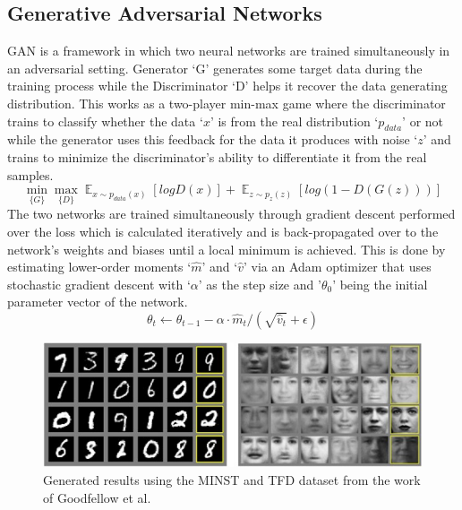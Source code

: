 \documentclass{Configuration_Files/PoliMi3i_thesis}
\begin{document}
\subsection{Generative Adversarial Networks}
GAN is a framework in which two neural networks are trained simultaneously in an 
adversarial setting. Generator ‘G’ generates some target data during the training 
process while the Discriminator ‘D’ helps it recover the data generating distribution. 
This works as a two-player min-max game \cite{IaG14} where the discriminator trains to 
classify whether the data ‘$x$’ is from the real distribution ‘$p_{data}$’ or not while the 
generator uses this feedback for the data it produces with noise ‘$z$’ and trains to 
minimize the discriminator’s ability to differentiate it from the real samples.
\begin{equation} \label{eq:ganminmax}
\min_{\{G\}}\max_{\{D\}} \mathop{{}\mathbb{E}}_{x\sim p_{data}(x)}[logD(x)]+ \mathop{{}\mathbb{E}}_{z\sim p_{z}(z)}[log(1-D(G(z)))]
\end{equation}
The two networks are trained simultaneously through gradient descent performed
over the loss which is calculated iteratively and is back-propagated over to the
network’s weights and biases until a local minimum is achieved. This is done by 
estimating lower-order moments ‘$\hat{m}$’ and ‘$\hat{v}$’ via an Adam optimizer that uses 
stochastic gradient descent with ‘$\alpha$’ as the step size and '$\theta_{0}$' being the initial parameter 
vector of the network.
\begin{equation} \label{eq:ganopt}
\theta_{t}\leftarrow \theta_{t-1} - \alpha \cdot \hat{m}_{t}/(\sqrt{\hat{v}_{t}} + \epsilon)
\end{equation}
\begin{figure}[H]
    \centering
    \includegraphics[width=1\textwidth]{gan_results.jpg}
    \caption[Generated numbers and faces from the work of Goodfellow et al.]{Generated results using the MINST and TFD dataset from the work of Goodfellow et al.}
    \label{fig:ganresults}
\end{figure}
\end{document}
